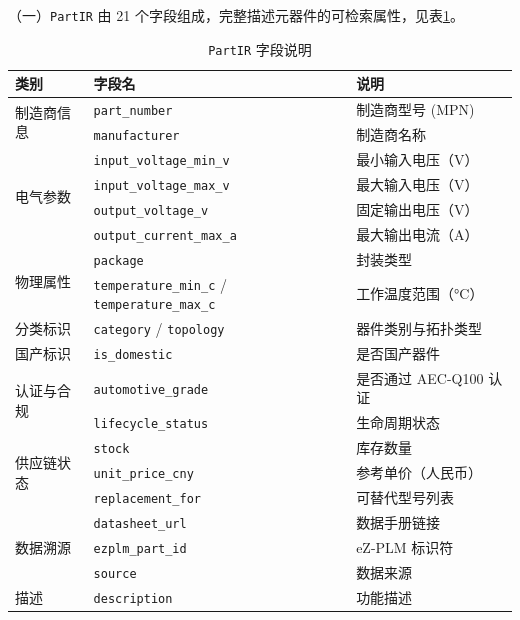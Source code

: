 （一）\texttt{PartIR} 由 21 个字段组成，完整描述元器件的可检索属性，见表\ref{tab:partir}。
\begin{table}[h]
\centering
\caption{\texttt{PartIR} 字段说明}
\label{tab:partir}
\footnotesize
\setlength{\tabcolsep}{4pt}
\renewcommand{\arraystretch}{0.9}
\begin{tabularx}{\textwidth}{p{2cm}p{4cm}X}
\toprule
\textbf{类别} & \textbf{字段名} & \textbf{说明} \\
\midrule

\multirow{2}{*}{制造商信息}
& \texttt{part\_number} & 制造商型号 (MPN)\\
& \texttt{manufacturer} & 制造商名称 \\
\midrule

\multirow{4}{*}{电气参数}
& \texttt{input\_voltage\_min\_v} & 最小输入电压（V） \\
& \texttt{input\_voltage\_max\_v} & 最大输入电压（V） \\
& \texttt{output\_voltage\_v} & 固定输出电压（V） \\
& \texttt{output\_current\_max\_a} & 最大输出电流（A） \\
\midrule

\multirow{2}{*}{物理属性}
& \texttt{package} & 封装类型 \\
& \texttt{temperature\_min\_c} / \texttt{temperature\_max\_c} & 工作温度范围（°C） \\
\midrule

分类标识
& \texttt{category} / \texttt{topology} & 器件类别与拓扑类型 \\
\midrule

国产标识
& \texttt{is\_domestic} & 是否国产器件 \\
\midrule

\multirow{2}{*}{认证与合规}
& \texttt{automotive\_grade} & 是否通过 AEC-Q100 认证 \\
& \texttt{lifecycle\_status} & 生命周期状态 \\
\midrule

\multirow{3}{*}{供应链状态}
& \texttt{stock} & 库存数量 \\
& \texttt{unit\_price\_cny} & 参考单价（人民币） \\
& \texttt{replacement\_for} & 可替代型号列表 \\
\midrule

\multirow{3}{*}{数据溯源}
& \texttt{datasheet\_url} & 数据手册链接 \\
& \texttt{ezplm\_part\_id} & eZ-PLM 标识符 \\
& \texttt{source} & 数据来源 \\
\midrule

描述
& \texttt{description} & 功能描述 \\
\bottomrule
\end{tabularx}
\end{table}

